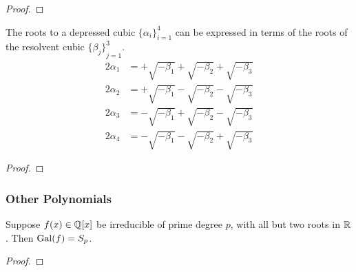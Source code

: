 \begin{proof}
\end{proof}
\begin{theorem}
    The roots to a depressed cubic \({\{\alpha_i\}}_{i=1}^4\)
    can be expressed in terms of the roots of the resolvent cubic \({\{\beta_j\}}_{j=1}^3\).
    \begin{align*}
        2\alpha_1 &= + \sqrt{-\beta_1} + \sqrt{-\beta_2} + \sqrt{-\beta_3} \\
        2\alpha_2 &= + \sqrt{-\beta_1} - \sqrt{-\beta_2} - \sqrt{-\beta_3} \\
        2\alpha_3 &= -\sqrt{-\beta_1} + \sqrt{-\beta_2} - \sqrt{-\beta_3} \\
        2\alpha_4 &= -\sqrt{-\beta_1} - \sqrt{-\beta_2} + \sqrt{-\beta_3}
    \end{align*}
\end{theorem}
\begin{proof}
\end{proof}

\subsubsection*{Other Polynomials}

\begin{theorem}
    Suppose \(f(x) \in \mathbb{Q}[x]\) be irreducible of prime degree \(p\),
    with all but two roots in \(\mathbb{R}\).
    Then \(\operatorname{Gal}(f) = S_p\).
\end{theorem}
\begin{proof}
\end{proof}

